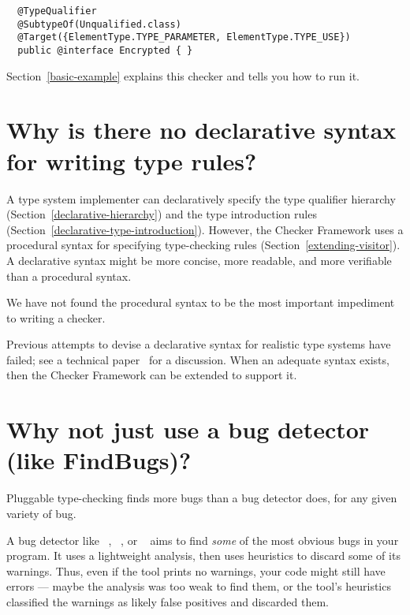 \begin{Verbatim}
  @TypeQualifier
  @SubtypeOf(Unqualified.class)
  @Target({ElementType.TYPE_PARAMETER, ElementType.TYPE_USE})
  public @interface Encrypted { }
\end{Verbatim}

Section~\ref{basic-example} explains this checker and tells
you how to run it.


\section{Why is there no declarative syntax for writing type rules?\label{faq-declarative-syntax-for-type-rules}}

A type system implementer can declaratively specify the type qualifier
hierarchy (Section~\ref{declarative-hierarchy}) and the type introduction rules
(Section~\ref{declarative-type-introduction}).  However, the Checker
Framework uses a procedural syntax for specifying type-checking
rules (Section~\ref{extending-visitor}).
A declarative syntax might be more concise, more readable, and more
verifiable than a procedural syntax.

We have not found the procedural syntax to be the most important impediment
to writing a checker.

Previous attempts to devise a declarative syntax 
for realistic type systems have failed; see a technical
paper~\cite{PapiACPE2008} for a discussion.  When an
adequate syntax exists, then the Checker Framework can be extended to
support it.


\section{Why not just use a bug detector (like FindBugs)?\label{faq-type-checking-vs-bug-detectors}}

Pluggable type-checking finds more bugs than a bug detector does, for any
given variety of bug.

A bug detector like ~\cite{HovemeyerP2004,HovemeyerSP2005},
~\cite{Artho2001}, or
~\cite{Copeland2005} aims to find \emph{some}
of the most obvious bugs in your program.  It uses a lightweight analysis,
then uses heuristics to discard some of its warnings.  Thus, even if the tool
prints no warnings, your code might still have errors --- maybe the
analysis was too weak to find them, or the tool's heuristics classified the
warnings as likely false positives and discarded them.

